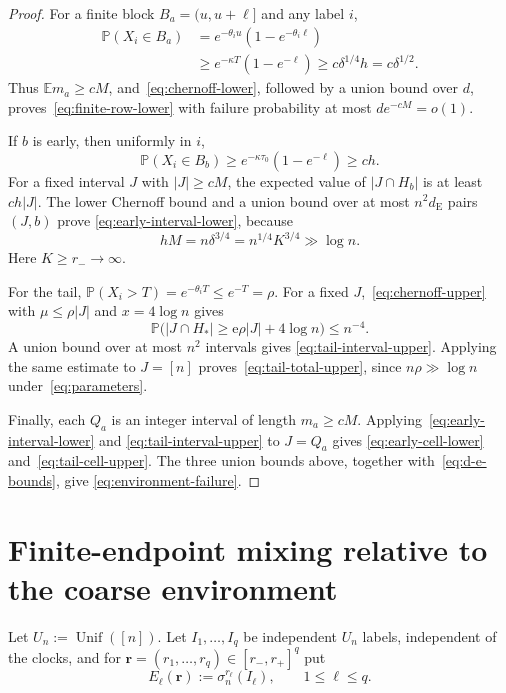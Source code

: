 \documentclass[11pt]{article}
\newcommand{\E}{\mathbb E}
\newcommand{\Pp}{\mathbb P}
\newcommand{\1}{\mathbf 1}
\newcommand{\Unif}{\operatorname{Unif}}
\theoremstyle{definition}
\theoremstyle{remark}
\begin{document}
\begin{proof}
For a finite block $B_a=(u,u+\ell]$ and any label $i$,
\begin{align*}
 \Pp(X_i\in B_a)
 &=e^{-\theta_i u}(1-e^{-\theta_i\ell})\\
 &\geq e^{-\kappa T}(1-e^{-\ell})
 \geq c\delta^{1/4}h
 =c\delta^{1/2}.
\end{align*}
Thus $\E m_a\geq cM$, and~\eqref{eq:chernoff-lower}, followed by a
union bound over $d$, proves~\eqref{eq:finite-row-lower} with failure
probability at most $d e^{-cM}=o(1)$.

If $b$ is early, then uniformly in $i$,
\[
  \Pp(X_i\in B_b)\geq e^{-\kappa\tau_0}(1-e^{-\ell})\geq ch.
\]
For a fixed interval $J$ with $|J|\geq cM$, the expected value of
$|J\cap H_b|$ is at least $ch|J|$.  The lower Chernoff bound and a union
bound over at most $n^2d_{\mathrm E}$ pairs $(J,b)$ prove
\eqref{eq:early-interval-lower}, because
\begin{equation}\label{eq:hM-large}
  hM=n\delta^{3/4}=n^{1/4}K^{3/4}\gg\log n.
\end{equation}
Here $K\geq r_-\to\infty$.

For the tail, $\Pp(X_i>T)=e^{-\theta_iT}\leq e^{-T}=\rho$.  For a fixed
$J$,~\eqref{eq:chernoff-upper} with
$\mu\leq\rho|J|$ and $x=4\log n$ gives
\[
 \Pp\bigl(|J\cap H_*|\geq \mathrm e\rho|J|+4\log n\bigr)\leq n^{-4}.
\]
A union bound over at most $n^2$ intervals gives
\eqref{eq:tail-interval-upper}.  Applying the same estimate to
$J=[n]$ proves~\eqref{eq:tail-total-upper}, since
$n\rho\gg\log n$ under~\eqref{eq:parameters}.

Finally, each $Q_a$ is an integer interval of length $m_a\geq cM$.
Applying~\eqref{eq:early-interval-lower} and
\eqref{eq:tail-interval-upper} to $J=Q_a$ gives
\eqref{eq:early-cell-lower} and~\eqref{eq:tail-cell-upper}.  The three
union bounds above, together with~\eqref{eq:d-e-bounds}, give
\eqref{eq:environment-failure}.
\end{proof}

\section{Finite-endpoint mixing relative to the coarse environment}
\label{sec:endpoint}

Let $U_n:=\Unif([n])$.  Let $I_1,\dots,I_q$ be independent $U_n$
labels, independent of the clocks, and for
$\mathbf r=(r_1,\dots,r_q)\in[r_-,r_+]^q$ put
\begin{equation}\label{eq:endpoint-vector}
 E_\ell(\mathbf r):=\sigma_n^{r_\ell}(I_\ell),
 \qquad 1\leq\ell\leq q.
\end{equation}
\end{document}
